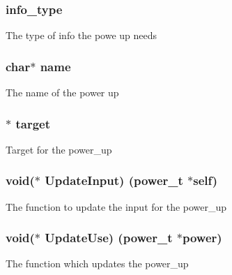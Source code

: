 \subsubsection[{\texorpdfstring{info\+\_\+type}{info_type}}]{ info\+\_\+type}\hypertarget{structpower__s_a92e471ab75337ebde8ffbddf14890542}{}\label{structpower__s_a92e471ab75337ebde8ffbddf14890542}
The type of info the powe up needs 
\subsubsection[{\texorpdfstring{name}{name}}]{\setlength{\rightskip}{0pt plus 5cm}char$\ast$ name}\hypertarget{structpower__s_a5ac083a645d964373f022d03df4849c8}{}\label{structpower__s_a5ac083a645d964373f022d03df4849c8}
The name of the power up 
\subsubsection[{\texorpdfstring{target}{target}}]{$\ast$ target}\hypertarget{structpower__s_a6729e2052b01af694ccadb9c401b57a0}{}\label{structpower__s_a6729e2052b01af694ccadb9c401b57a0}
Target for the power\+\_\+up 
\subsubsection[{\texorpdfstring{Update\+Input}{UpdateInput}}]{\setlength{\rightskip}{0pt plus 5cm}void($\ast$ Update\+Input) ({\bf power\+\_\+t} $\ast$self)}\hypertarget{structpower__s_a99fd6ee1c03eaf0de0f3e2c71237db69}{}\label{structpower__s_a99fd6ee1c03eaf0de0f3e2c71237db69}
The function to update the input for the power\+\_\+up 
\subsubsection[{\texorpdfstring{Update\+Use}{UpdateUse}}]{\setlength{\rightskip}{0pt plus 5cm}void($\ast$ Update\+Use) ({\bf power\+\_\+t} $\ast$power)}\hypertarget{structpower__s_a3cad653c3718314662c4a98659778999}{}\label{structpower__s_a3cad653c3718314662c4a98659778999}
The function which updates the power\+\_\+up 
